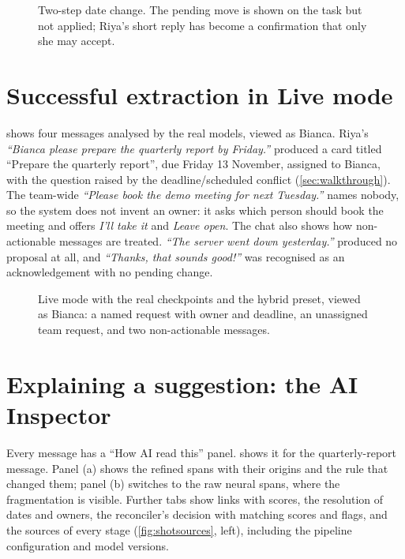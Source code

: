 \begin{figure}[t]
\centering
{}
\caption[A task modification proposal]{Two-step date change. The pending move is shown on the task but not applied; Riya's short reply has become a confirmation that only she may accept.}
\label{fig:shotdate}
\end{figure}

\section{Successful extraction in Live mode}
 shows four messages analysed by the real models, viewed as Bianca. Riya's \emph{``Bianca please prepare the quarterly report by Friday.''} produced a card titled ``Prepare the quarterly report'', due Friday 13 November, assigned to Bianca, with the question raised by the deadline/scheduled conflict (\cref{sec:walkthrough}). The team-wide \emph{``Please book the demo meeting for next Tuesday.''} names nobody, so the system does not invent an owner: it asks which person should book the meeting and offers \emph{I'll take it} and \emph{Leave open}. The chat also shows how non-actionable messages are treated. \emph{``The server went down yesterday.''} produced no proposal at all, and \emph{``Thanks, that sounds good!''} was recognised as an acknowledgement with no pending change.

\begin{figure}[t]
\centering
{}
\caption[Live extraction with the real models]{Live mode with the real checkpoints and the hybrid preset, viewed as Bianca: a named request with owner and deadline, an unassigned team request, and two non-actionable messages.}
\label{fig:shotlive}
\end{figure}

\section{Explaining a suggestion: the AI Inspector}
Every message has a ``How AI read this'' panel.  shows it for the quarterly-report message. Panel (a) shows the refined spans with their origins and the rule that changed them; panel (b) switches to the raw neural spans, where the fragmentation is visible. Further tabs show links with scores, the resolution of dates and owners, the reconciler's decision with matching scores and flags, and the sources of every stage (\cref{fig:shotsources}, left), including the pipeline configuration and model versions.

